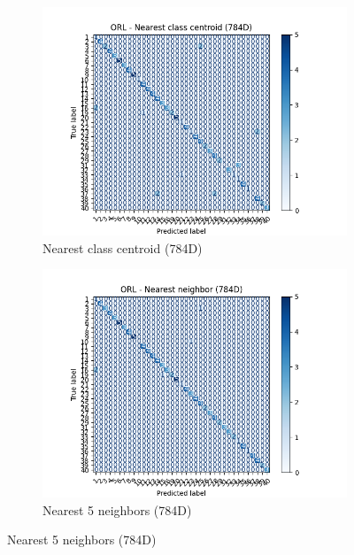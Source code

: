 \begin{figure}[htbp]
        \begin{subfigure}[b]{.33\linewidth}
            \centering
            \includegraphics[width=1\linewidth]{../source/orl/pictures/nearestClassCentroid-confusion-784d.png}
            \caption{Nearest class centroid (784D)}
            \label{fig:orl-confusion-ncc-784}
        \end{subfigure}%
        \begin{subfigure}[b]{0.33\linewidth}
            \centering
            \includegraphics[width=1\linewidth]{../source/orl/pictures/nearestNeighbor-5-confusion-784d.png}
            \caption{Nearest 5 neighbors (784D)}
            \label{fig:orl-confusion-nn-784}

\end{subfigure}
\end{figure}
